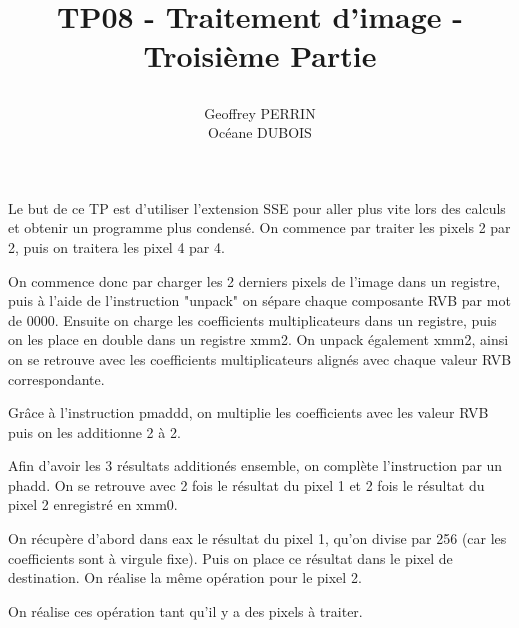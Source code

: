 \documentclass[11pt]{report}
\title{\textbf{TP08 - Traitement d'image - Troisième Partie }
\author{Geoffrey PERRIN \\ Océane DUBOIS\\}
\date{}}
\begin{document}
\maketitle

\newpage

Le but de ce TP est d'utiliser l'extension SSE pour aller plus vite lors des calculs et obtenir un programme plus condensé.
On commence par traiter les pixels 2 par 2, puis on traitera les pixel 4 par 4.

On commence donc par charger les 2 derniers pixels de l'image dans un registre, puis à l'aide de l'instruction "unpack" on sépare chaque composante RVB par mot de 0000. Ensuite on charge les coefficients multiplicateurs dans un registre, puis on les place en double dans un registre xmm2.
On unpack également xmm2, ainsi on se retrouve avec les coefficients multiplicateurs alignés avec chaque valeur RVB correspondante.

Grâce à l'instruction pmaddd, on multiplie les coefficients avec les valeur RVB puis on les additionne 2 à 2.

Afin d'avoir les 3 résultats additionés ensemble, on complète l'instruction par un phadd. On se retrouve avec 2 fois le résultat du pixel 1 et 2 fois le résultat du pixel 2 enregistré en xmm0.

On récupère d'abord dans eax le résultat du pixel 1, qu'on divise par 256 (car les coefficients sont à virgule fixe). Puis on place ce résultat dans le pixel de destination.
On réalise la même opération pour le pixel 2.

On réalise ces opération tant qu'il y a des pixels à traiter.
\end{document}
